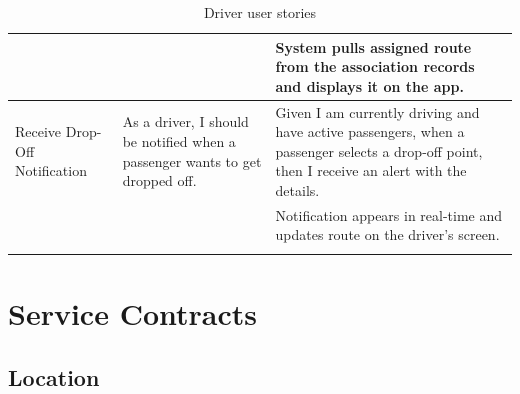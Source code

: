 \documentclass[a4paper,12pt]{article}
\begin{document}
\begin{longtable}{|p{4cm}|p{6cm}|p{5cm}|}
& & System pulls assigned route from the association records and displays it on the app. \\
\hline
Receive Drop-Off Notification & As a driver, I should be notified when a passenger wants to get dropped off. & Given I am currently driving and have active passengers, when a passenger selects a drop-off point, then I receive an alert with the details. \\
& & Notification appears in real-time and updates route on the driver’s screen. \\
\hline
\caption{Driver user stories}
\label{tab:driver-user-stories}
\end{longtable}

\section{Service Contracts}

\subsection*{Location}
\end{document}

